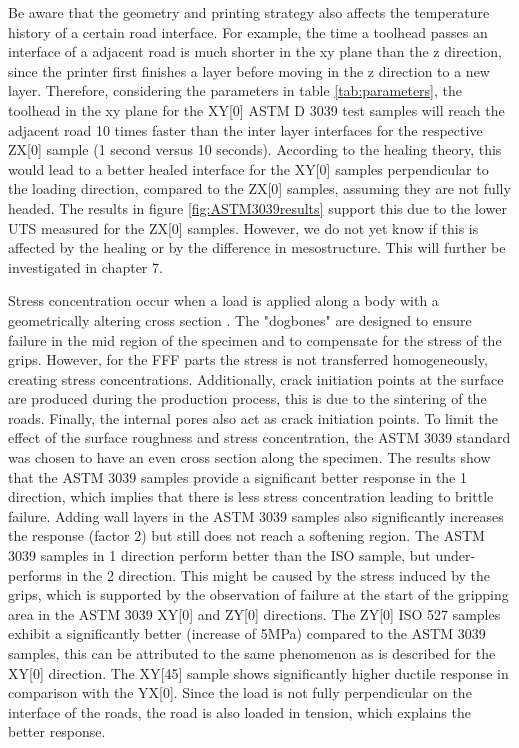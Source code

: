 Be aware that the geometry and printing strategy also affects the temperature history of a certain road interface. For example, the time a toolhead passes an interface of a adjacent road is much shorter in the xy plane than the z direction, since the printer first finishes a layer before moving in the z direction to a new layer. Therefore, considering the parameters in table \ref{tab:parameters}, the toolhead in the xy plane for the XY[0] ASTM D 3039 test samples will reach the adjacent road 10 times faster than the inter layer interfaces for the respective ZX[0] sample (1 second versus 10 seconds). According to the healing theory, this would lead to a better healed interface for the XY[0] samples perpendicular to the loading direction, compared to the ZX[0] samples, assuming they are not fully headed. The results in figure \ref{fig:ASTM3039results} support this due to the lower UTS measured for the ZX[0] samples. However, we do not yet know if this is affected by the healing or by the difference in mesostructure. This will further be investigated in chapter 7. 

Stress concentration occur when a load is applied along a body with a geometrically altering cross section \cite{TronvollTheApproach}. The "dogbones" are designed to ensure failure in the mid region of the specimen and to compensate for the stress of the grips. However, for the FFF parts the stress is not transferred homogeneously, creating stress concentrations. Additionally, crack initiation points at the surface are produced during the production process, this is due to the sintering of the roads. Finally, the internal pores also act as crack initiation points. To limit the effect of the surface roughness and stress concentration, the ASTM 3039 standard was chosen to have an even cross section along the specimen. The results show that the ASTM 3039 samples provide a significant better response in the 1 direction, which implies that there is less stress concentration leading to brittle failure. Adding wall layers in the ASTM 3039 samples also significantly increases the response (factor 2) but still does not reach a softening region. The ASTM 3039 samples in 1 direction perform better than the ISO sample, but under-performs in the 2 direction. This might be caused by the stress induced by the grips, which is supported by the observation of failure at the start of the gripping area in the ASTM 3039  XY[0] and ZY[0] directions. The ZY[0] ISO 527 samples exhibit a significantly better (increase of 5MPa) compared to the ASTM 3039 samples, this can be attributed to the same phenomenon as is described for the XY[0] direction.
The XY[45] sample shows significantly higher ductile response in comparison with the YX[0]. Since the load is not fully perpendicular on the interface of the roads, the road is also loaded in tension, which explains the better response.

